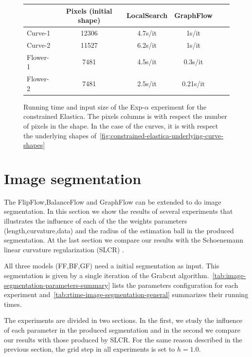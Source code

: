 \begin{figure}
\center
\captionsetup{type=table}
\begin{tabular}{|l|c|c|c|c|c|}
\hline
& Pixels (initial shape) & LocalSearch & GraphFlow \\
\hline
Curve-1 & 12306 & 4.7s/it & 1s/it\\
Curve-2 & 11527 & 6.2s/it & 1s/it\\
Flower-1  & 7481 & 4.5s/it & 0.3s/it \\
Flower-2 & 7481 & 2.5s/it & 0.21s/it\\
\hline
\end{tabular}
\caption{Running time and input size of the Exp-$\alpha$ experiment for the constrained Elastica. The pixels columns is with respect the number of pixels in the shape. In the case of the curves, it is with respect the underlying shapes of~\cref{fig:constrained-elastica-underlying-curve-shapes}}
\label{tab:rtime-constrained-elastica-general} 
\end{figure}


\section{Image segmentation}

The FlipFlow,BalanceFlow and GraphFlow can be extended to do image segmentation. In this section we show the results of several experiments that illustrates the influence of each of the the weights parameters (length,curvature,data) and the radius of the estimation ball in the produced segmentation. At the last section we compare our results with the Schoenemann linear curvature regularization (SLCR) \cite{schoenemann09linear}. 

All three models (FF,BF,GF) need a initial segmentation as input. This segmentation is given by a single iteration of the Grabcut algorithm.~\cref{tab:image-segmentation-parameters-summary} lists the parameters configuration for each experiment and~\cref{tab:rtime-image-segmentation-general} summarizes their running times. 

The experiments are divided in two sections. In the first, we study the influence of each parameter in the produced segmentation and in the second we compare our results with those produced by SLCR. For the same reason described in the previous section, the grid step in all experiments is set to $h=1.0$.


